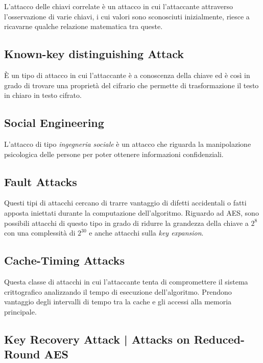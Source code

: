 \textsf{\small L'attacco delle chiavi correlate è un attacco in cui l'attaccante attraverso l'osservazione di varie chiavi, i cui valori sono sconosciuti inizialmente, riesce a ricavarne qualche relazione matematica tra queste.} %

\subsection{Known-key distinguishing Attack}

\textsf{\small È un tipo di attacco in cui l'attaccante è a conoscenza della chiave ed è così in grado di trovare una proprietà del cifrario che permette di trasformazione il testo in chiaro in testo cifrato.}

\subsection{Social Engineering}

\textsf{\small L'attacco di tipo \emph{ingegneria sociale} è un attacco che riguarda la manipolazione psicologica delle persone per poter ottenere informazioni confidenziali.}

\subsection{Fault Attacks}

\textsf{\small Questi tipi di attacchi cercano di trarre vantaggio di difetti accidentali o fatti apposta iniettati durante la computazione dell'algoritmo. Riguardo ad AES, sono possibili attacchi di questo tipo in grado di ridurre la grandezza della chiave a $2^8$ con una complessità di $2^{30}$ e anche attacchi sulla \emph{key expansion}.}

\subsection{Cache-Timing Attacks}

\textsf{\small Questa classe di attacchi in cui l'attaccante tenta di compromettere il sistema crittografico analizzando il tempo di esecuzione dell'algoritmo. Prendono vantaggio degli intervalli di tempo tra la cache e gli accessi alla memoria principale.}

\subsection{Key Recovery Attack | Attacks on Reduced-Round AES}

